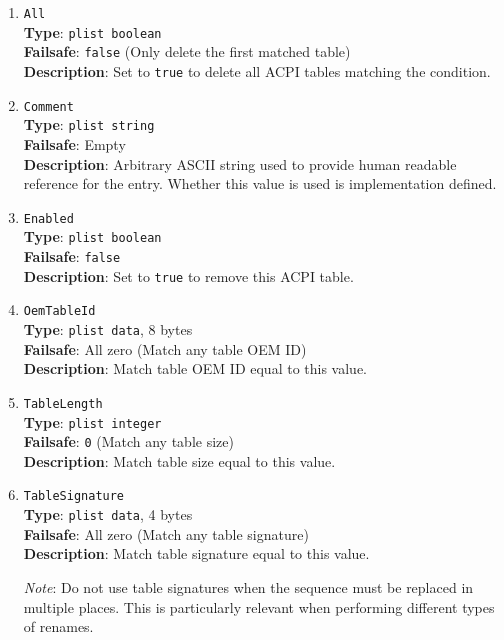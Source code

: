 \documentclass[]{article}
\begin{document}
\begin{enumerate}

\item
  \texttt{All}\\
  \textbf{Type}: \texttt{plist\ boolean}\\
  \textbf{Failsafe}: \texttt{false} (Only delete the first matched table)\\
  \textbf{Description}: Set to \texttt{true} to delete all ACPI tables matching the
  condition.

\item
  \texttt{Comment}\\
  \textbf{Type}: \texttt{plist\ string}\\
  \textbf{Failsafe}: Empty\\
  \textbf{Description}: Arbitrary ASCII string used to provide human readable
  reference for the entry. Whether this value is used is implementation defined.

\item
  \texttt{Enabled}\\
  \textbf{Type}: \texttt{plist\ boolean}\\
  \textbf{Failsafe}: \texttt{false}\\
  \textbf{Description}: Set to \texttt{true} to remove this ACPI table.

\item
  \texttt{OemTableId}\\
  \textbf{Type}: \texttt{plist\ data}, 8 bytes\\
  \textbf{Failsafe}: All zero (Match any table OEM ID)\\
  \textbf{Description}: Match table OEM ID equal to this value.

\item
  \texttt{TableLength}\\
  \textbf{Type}: \texttt{plist\ integer}\\
  \textbf{Failsafe}: \texttt{0} (Match any table size)\\
  \textbf{Description}: Match table size equal to this value.

\item
  \texttt{TableSignature}\\
  \textbf{Type}: \texttt{plist\ data}, 4 bytes\\
  \textbf{Failsafe}: All zero (Match any table signature)\\
  \textbf{Description}: Match table signature equal to this value.

  \emph{Note}: Do not use table signatures when the sequence
  must be replaced in multiple places. This is particularly relevant
  when performing different types of renames.

\end{enumerate}
\end{document}
